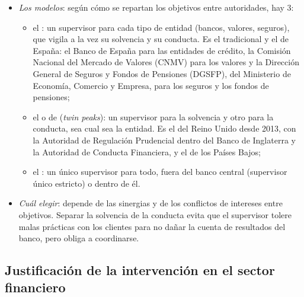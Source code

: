 \documentclass[11pt]{article}
\begin{document}
\begin{itemize}
\item \emph{Los modelos}: según cómo se repartan los objetivos entre autoridades, hay 3\nocite{KremersSchoenmakerWierts2003}:
  \begin{itemize}
  \item el : un supervisor para cada tipo de entidad (bancos, valores, seguros), que vigila a la vez su solvencia y su conducta. Es el tradicional y el de España: el Banco de España para las entidades de crédito, la Comisión Nacional del Mercado de Valores (CNMV) para los valores y la Dirección General de Seguros y Fondos de Pensiones (DGSFP), del Ministerio de Economía, Comercio y Empresa, para los seguros y los fondos de pensiones\nocite{BOE2024DGSFP};
  \item el  o de  (\emph{twin peaks}): un supervisor para la solvencia y otro para la conducta, sea cual sea la entidad. Es el del Reino Unido desde 2013, con la Autoridad de Regulación Prudencial dentro del Banco de Inglaterra y la Autoridad de Conducta Financiera, y el de los Países Bajos;
  \item el : un único supervisor para todo, fuera del banco central (supervisor único estricto) o dentro de él.
  \end{itemize}
\item \emph{Cuál elegir}: depende de las sinergias y de los conflictos de intereses entre objetivos. Separar la solvencia de la conducta evita que el supervisor tolere malas prácticas con los clientes para no dañar la cuenta de resultados del banco, pero obliga a coordinarse\nocite{KremersSchoenmakerWierts2003}.
\end{itemize}

\subsection{Justificación de la intervención en el sector financiero}\label{sec:justificacion}
\end{document}
